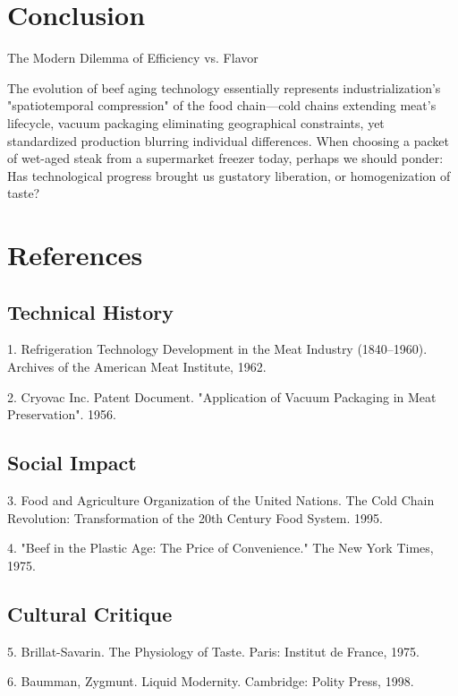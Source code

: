 \documentclass[lettersize,journal]{IEEEtran}
\begin{document}
\section{Conclusion}

The Modern Dilemma of Efficiency vs. Flavor

The evolution of beef aging technology essentially represents industrialization's "spatiotemporal compression" of the food chain—cold chains extending meat's lifecycle, vacuum packaging eliminating geographical constraints, yet standardized production blurring individual differences. When choosing a packet of wet-aged steak from a supermarket freezer today, perhaps we should ponder: Has technological progress brought us gustatory liberation, or homogenization of taste?

\section{References}

\subsection{Technical History}

1. Refrigeration Technology Development in the Meat Industry (1840–1960). Archives of the American Meat Institute, 1962.

2. Cryovac Inc. Patent Document. "Application of Vacuum Packaging in Meat Preservation". 1956.

\subsection{Social Impact}

3. Food and Agriculture Organization of the United Nations. The Cold Chain Revolution: Transformation of the 20th Century Food System. 1995.

4. "Beef in the Plastic Age: The Price of Convenience." The New York Times, 1975.

\subsection{Cultural Critique}

5. Brillat-Savarin. The Physiology of Taste. Paris: Institut de France, 1975.

6. Baumman, Zygmunt. Liquid Modernity. Cambridge: Polity Press, 1998.
\end{document}

